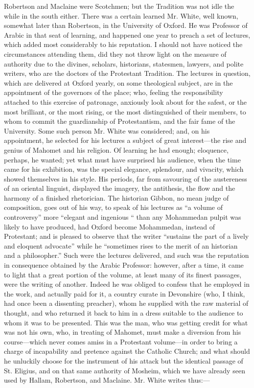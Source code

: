 Robertson and Maclaine were Scotchmen; but the
Tradition was not idle the while in the south either.
There was a certain learned Mr. White, well known,
somewhat later than Robertson, in the University of
Oxford. He was Professor of Arabic in that seat of learning, and happened one year to preach a set of
lectures, which added most considerably to his
reputation. I should not have noticed the circumstances
attending them, did they not throw light on the measure
of authority due to the divines, scholars, historians,
statesmen, lawyers, and polite writers, who are the
doctors of the Protestant Tradition. The lectures in
question, which are delivered at Oxford yearly, on some
theological subject, are in the appointment of the
governors of the place; who, feeling the responsibility
attached to this exercise of patronage, anxiously look
about for the safest, or the most brilliant, or the most
rising, or the most distinguished of their members, to
whom to commit the guardianship of Protestantism, and the
fair fame of the University. Some such person Mr. White
was considered; and, on his appointment, he selected for
his lectures a subject of great interest—the rise
and genius of Mahomet and his religion. Of learning he
had enough; eloquence, perhaps, he wanted; yet what must
have surprised his audience, when the time came for his
exhibition, was the special elegance, splendour, and
vivacity, which showed themselves in his style. His
periods, far from savouring of the austereness of an
oriental linguist, displayed the imagery, the antithesis,
the flow and the harmony of a finished rhetorician. The
historian Gibbon, no mean judge of composition, goes out
of his way, to speak of his lectures as ``a volume of
controversy'' more ``elegant and ingenious ``
than any Mohammedan pulpit was likely to have produced,
had Oxford become Mohammedan, instead of Protestant; and
is pleased to observe that the writer ``sustains the
part of a lively and eloquent advocate'' while he
``sometimes rises to the merit of an historian and a
philosopher.'' Such were the lectures delivered, and
such was the reputation in consequence obtained by the
Arabic Professor: however, after a time, it came to light
that a great portion of the volume, at least many of its
finest passages, were the writing of another. Indeed he
was obliged to confess that he employed in the work, and
actually paid for it, a country curate in Devonshire
(who, I think, had once been a dissenting preacher), whom
he supplied with the raw material of thought, and who
returned it back to him in a dress suitable to the
audience to whom it was to be presented. This was the
man, who was getting credit for what was not his own,
who, in treating of Mahomet, must make a diversion from
his course—which never comes amiss in a Protestant
volume—in order to bring a charge of incapability
and pretence against the Catholic Church; and what should
he unluckily choose for the instrument of his attack but
the identical passage of St. Eligius, and on that same
authority of Mosheim, which we have already seen used by
Hallam, Robertson, and Maclaine. Mr. White writes
thus:—

